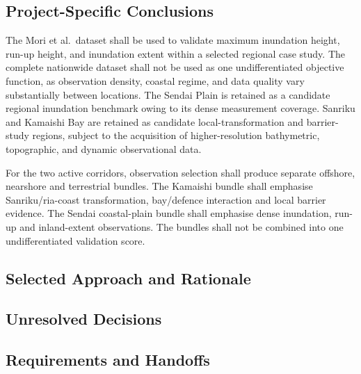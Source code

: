 \subsection{Project-Specific Conclusions}
\label{sec:res-dat-obs-conclusions}


The Mori et al.\ dataset shall be used to validate maximum inundation height, run-up height, and inundation extent within a selected regional case study. The complete nationwide dataset shall not be used as one undifferentiated objective function, as observation density, coastal regime, and data quality vary substantially between locations. The Sendai Plain is retained as a candidate regional inundation benchmark owing to its dense measurement coverage. Sanriku and Kamaishi Bay are retained as candidate local-transformation and barrier-study regions, subject to the acquisition of higher-resolution bathymetric, topographic, and dynamic observational data.

For the two active corridors, observation selection shall produce
separate offshore, nearshore and terrestrial bundles. The Kamaishi
bundle shall emphasise Sanriku/ria-coast transformation, bay/defence
interaction and local barrier evidence. The Sendai coastal-plain bundle
shall emphasise dense inundation, run-up and inland-extent observations.
The bundles shall not be combined into one undifferentiated validation
score.

\subsection{Selected Approach and Rationale}
\label{sec:res-dat-obs-selected-approach}


\subsection{Unresolved Decisions}
\label{sec:res-dat-obs-unresolved-decisions}


\subsection{Requirements and Handoffs}
\label{sec:res-dat-obs-requirements}

